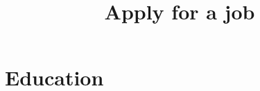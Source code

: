 \documentclass[10pt,a4paper]{moderncv}
\title{\normalsize{Apply for a job}}
\begin{document}
\maketitle
\section{Education}
\end{document}
